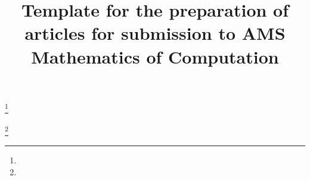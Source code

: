 \documentclass{mcom-l}
\theoremstyle{definition}
\theoremstyle{remark}
\numberwithin{equation}{section}
\begin{document}
\title{Template for the preparation of articles for submission to AMS Mathematics of Computation}


\author{}
\address{}
\curraddr{}
\email{}
\thanks{}

\author{}
\address{}
\curraddr{}
\email{}
\thanks{}


\date{}

\dedicatory{}

\begin{abstract}
\end{abstract}

\maketitle



\end{document}
